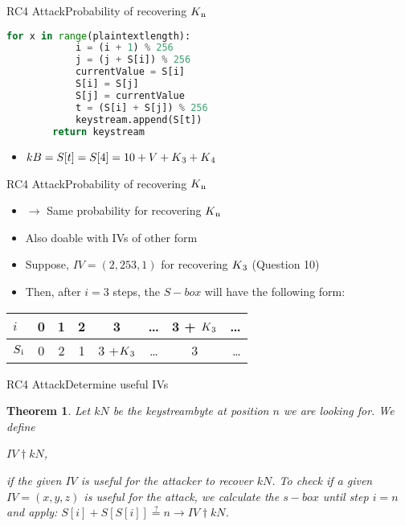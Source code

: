 \documentclass[
	aspectratio=169,	%
	onlytextwidth,		%
	t,					%
	]{beamer}
\newtheorem{thm}{Theorem}
\begin{document}
\begin{frame}[fragile]{RC4 Attack}{Probability of recovering $K\textsubscript{n}$}
	\small
	\begin{lstlisting}[language=Python]
		for x in range(plaintextlength):
			i = (i + 1) % 256
			j = (j + S[i]) % 256
			currentValue = S[i]
			S[i] = S[j]
			S[j] = currentValue
			t = (S[i] + S[j]) % 256
			keystream.append(S[t])
		return keystream
	\end{lstlisting}
	\normalsize

	\begin{itemize}
		\item $kB = S[t] = S[4] = 10 + V + K\textsubscript{3} + K\textsubscript{4}$
	\end{itemize}
\end{frame}

\begin{frame}[fragile]{RC4 Attack}{Probability of recovering $K\textsubscript{n}$}
	\begin{itemize}
		\item $\rightarrow$ Same probability for recovering $K\textsubscript{n}$
		\item Also doable with IVs of other form
		\item Suppose, $IV = (2,253,1)$ for recovering $K\textsubscript{3}$ (Question 10)
		\item Then, after $i=3$ steps, the $S-box$ will have the following form:
	\end{itemize}

	\begin{tabular}{l|c|c|c|c|c|c|r}
		$i$ & 0 & 1 & 2 & 3 & \dots & 3 + $K\textsubscript{3}$ & \dots \\
		\hline
		$S\textsubscript{i}$ & 0 & 2 & 1 & 3 +$K\textsubscript{3}$ & \dots & 3 & \dots\\
	\end{tabular}
\end{frame}

\begin{frame}[fragile]{RC4 Attack}{Determine useful IVs}
	\begin{thm}
		Let $kN$ be the keystreambyte at position $n$ we are looking for. We define\\
		\begin{center}$IV \dagger kN$,
		\end{center}
		if the given $IV$ is useful for the attacker to recover $kN$.
		To check if a given $IV=(x,y,z)$ is useful for the attack, we calculate the $s-box$ until step $i=n$ and apply:
		$S[i] + S[S[i]] \stackrel{?}{=} n \rightarrow IV \dagger kN$.
	\end{thm} 
\end{frame}
\end{document}
